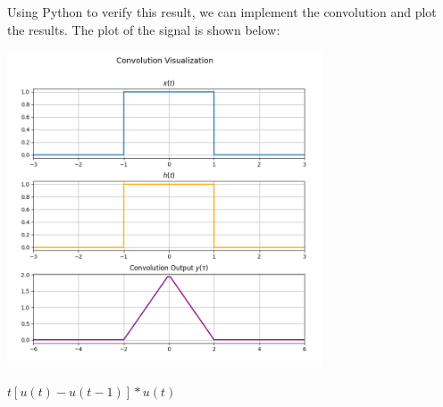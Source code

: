 \documentclass[a4paper, 10pt]{article}
\begin{document}
\begin{solution}
Using Python to verify this result, we can implement the convolution and plot the results.
The plot of the signal is shown below:
\begin{center}
    \includegraphics[width=0.7\textwidth]{images/problem_1_2_snapshot.png}
\end{center}
\end{solution}

\newpage

\begin{subproblems}[resume]
    \item \( t[u(t)-u(t-1)]*u(t) \)
\end{subproblems}
\end{document}
